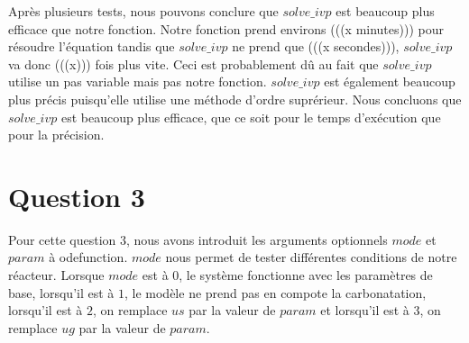 \documentclass[11pt]{report}
\newcommand{\mychapter}[2]{
    \setcounter{chapter}{#1}
    \setcounter{section}{0}
    \chapter*{#2}
    \addcontentsline{toc}{chapter}{#2}
}
\begin{document}
            \par
            Après plusieurs tests, nous pouvons conclure que $solve\_ivp$ est beaucoup plus efficace que notre fonction.
            Notre fonction prend environs (((x minutes))) pour résoudre l'équation tandis que $solve\_ivp$ ne prend que (((x secondes))),
            $solve\_ivp$ va donc (((x))) fois plus vite.
            Ceci est probablement dû au fait que $solve\_ivp$ utilise un pas variable mais pas notre fonction.
            $solve\_ivp$ est également beaucoup plus précis puisqu'elle utilise une méthode d'ordre suprérieur.
            Nous concluons que $solve\_ivp$ est beaucoup plus efficace, que ce soit pour le temps d'exécution que pour la précision.
    \mychapter{3}{Question 3}
        Pour cette question 3, nous avons introduit les arguments optionnels $mode$ et $param$ à odefunction.
        $mode$ nous permet de tester différentes conditions de notre réacteur.
        Lorsque $mode$ est à $0$, le système fonctionne avec les paramètres de base,
        lorsqu'il est à $1$, le modèle ne prend pas en compote la carbonatation,
        lorsqu'il est à $2$, on remplace $us$ par la valeur de $param$
        et lorsqu'il est à $3$, on remplace $ug$ par la valeur de $param$.
\end{document}
